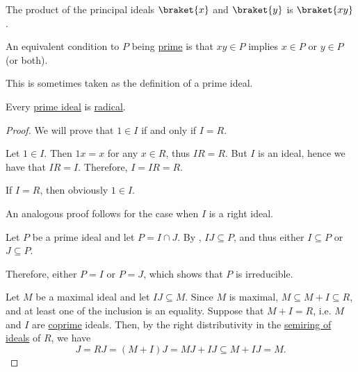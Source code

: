 \begin{proposition}
\begin{thmenum}[series=thm:def:semiring_ideal/properties]
     The product of the principal ideals \( \braket{x} \) and \( \braket{y} \) is \( \braket{xy} \).

     An equivalent condition to \( P \) being \hyperref[def:semiring_ideal/prime]{prime} is that \( xy \in P \) implies \( x \in P \) or \( y \in P \) (or both).

    This is sometimes taken as the definition of a prime ideal.

     Every \hyperref[def:semiring_ideal/prime]{prime ideal} is \hyperref[def:semiring_ideal/radical]{radical}.
  \end{thmenum}
\end{proposition}
\begin{proof}
   We will prove that \( 1 \in I \) if and only if \( I = R \).

  \SufficiencySubProof* Let \( 1 \in I \). Then \( 1x = x \) for any \( x \in R \), thus \( IR = R \). But \( I \) is an ideal, hence we have that \( IR = I \). Therefore, \( I = IR = R \).

  \NecessitySubProof* If \( I = R \), then obviously \( 1 \in I \).

  An analogous proof follows for the case when \( I \) is a right ideal.

   Let \( P \) be a prime ideal and let \( P = I \cap J \). By , \( IJ \subseteq P \), and thus either \( I \subseteq P \) or \( J \subseteq P \).

  Therefore, either \( P = I \) or \( P = J \), which shows that \( P \) is irreducible.

   Let \( M \) be a maximal ideal and let \( IJ \subseteq M \). Since \( M \) is maximal, \( M \subseteq M + I \subseteq R \), and at least one of the inclusion is an equality. Suppose that \( M + I = R \), i.e. \( M \) and \( I \) are \hyperref[def:semiring_ideal/coprime]{coprime} ideals. Then, by the right distributivity in the \hyperref[thm:semiring_of_ideals/lattice]{semiring of ideals} of \( R \), we have
  \begin{equation*}
    J = RJ = (M + I)J = MJ + IJ \subseteq M + IJ = M.
  \end{equation*}


\end{proof}
